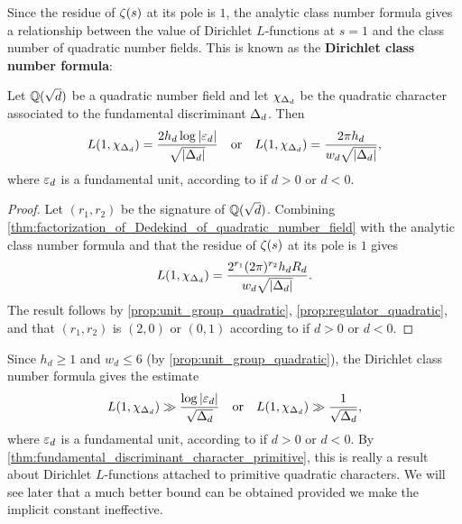       Since the residue of $\zeta(s)$ at its pole is $1$, the analytic class number formula gives a relationship between the value of Dirichlet $L$-functions at $s = 1$ and the class number of quadratic number fields. This is known as the \textbf{Dirichlet class number formula}:

      \begin{corollary*}
        Let $\mathbb{Q}(\sqrt{d})$ be a quadratic number field and let $\chi_{\Delta_{d}}$ be the quadratic character associated to the fundamental discriminant $\Delta_{d}$. Then
        \[
          L(1,\chi_{\Delta_{d}}) = \frac{2h_{d}\log|\varepsilon_{d}|}{\sqrt{|\Delta_{d}|}} \quad \text{or} \quad L(1,\chi_{\Delta_{d}}) = \frac{2\pi h_{d}}{w_{d}\sqrt{|\Delta_{d}|}},
        \]
        where $\varepsilon_{d}$ is a fundamental unit, according to if $d > 0$ or $d < 0$.
      \end{corollary*}
      \begin{proof}
        Let $(r_{1},r_{2})$ be the signature of $\mathbb{Q}(\sqrt{d})$. Combining \cref{thm:factorization_of_Dedekind_of_quadratic_number_field} with the analytic class number formula and that the residue of $\zeta(s)$ at its pole is $1$ gives
        \[
          L(1,\chi_{\Delta_{d}}) = \frac{2^{r_{1}}(2\pi)^{r_{2}}h_{d}R_{d}}{w_{d}\sqrt{|\Delta_{d}|}}.
        \]
        The result follows by \cref{prop:unit_group_quadratic}, \cref{prop:regulator_quadratic}, and that $(r_{1},r_{2})$ is $(2,0)$ or $(0,1)$ according to if $d > 0$ or $d < 0$.
      \end{proof}
      
      Since $h_{d} \ge 1$ and $w_{d} \le 6$ (by \cref{prop:unit_group_quadratic}), the Dirichlet class number formula gives the estimate
      \begin{equation}\label{equ:lower_bound_at_1_Dirichlet_real_character}
        L(1,\chi_{\Delta_{d}}) \gg \frac{\log|\varepsilon_{d}|}{\sqrt{\Delta_{d}}} \quad \text{or} \quad L(1,\chi_{\Delta_{d}}) \gg \frac{1}{\sqrt{\Delta_{d}}},
      \end{equation}
      where $\varepsilon_{d}$ is a fundamental unit, according to if $d > 0$ or $d < 0$. By \cref{thm:fundamental_discriminant_character_primitive}, this is really a result about Dirichlet $L$-functions attached to primitive quadratic characters. We will see later that a much better bound can be obtained provided we make the implicit constant ineffective.